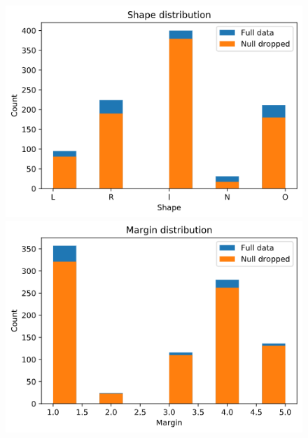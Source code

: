 \documentclass[11pt,a4paper]{article}
\begin{document}
    
\begin{figure}[H]
    \centering
    
    \begin{minipage}{0.5\textwidth}
        \centering
        \includegraphics[scale=0.35]{img/shape-distribution.png}
    \end{minipage}%
    \begin{minipage}{0.5\textwidth}
        \centering
        \includegraphics[scale=0.35]{img/margin-distribution.png}
    \end{minipage}
    
\end{figure}
    
\end{document}
